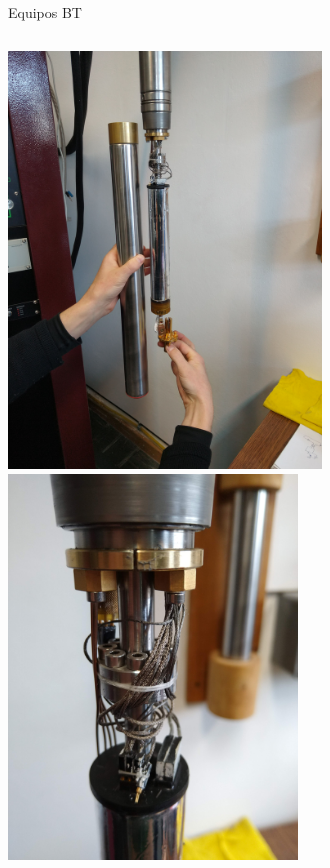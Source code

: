 \documentclass[ignorenonframetext,12pt]{beamer}
\begin{document}
\begin{frame}{Equipos BT}
				\begin{columns}
								\begin{column}{0.45\textwidth}
												\includegraphics[angle=-90,width=0.65\textwidth]{IMG_20190523_111114131} \\ 
												\includegraphics[angle=-90,width=0.6\textwidth]{IMG_20190523_105054061}
								\end{column}
								\begin{column}{0.45\textwidth}

\end{column}
\end{columns}
\end{frame}
\end{document}

